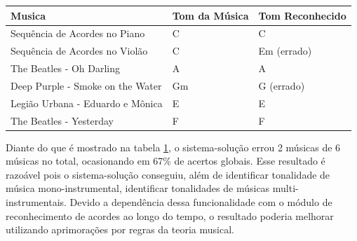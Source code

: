 \begin{table}[h]
\centering
\begin{tabular}{|l|l|l|}
\hline
Musica                           & Tom da Música & Tom Reconhecido \\ \hline
Sequência de Acordes no Piano    & C             & C               \\ \hline
Sequência de Acordes no Violão   & C             & Em (errado)     \\ \hline
The Beatles - Oh Darling         & A             & A               \\ \hline
Deep Purple - Smoke on the Water & Gm            & G (errado)      \\ \hline
Legião Urbana - Eduardo e Mônica & E             & E               \\ \hline
The Beatles - Yesterday          & F             & F               \\ \hline
\end{tabular}
\label{tab:tons}
\end{table}

Diante do que é mostrado na tabela \ref{tab:tons}, o sistema-solução errou 2 músicas de 6 músicas no total, ocasionando em 67\% de acertos globais. Esse resultado é razoável pois o sistema-solução conseguiu, além de identificar tonalidade de música mono-instrumental, identificar tonalidades de músicas multi-instrumentais. Devido a dependência dessa funcionalidade com o módulo de reconhecimento de acordes ao longo do tempo, o resultado poderia melhorar utilizando aprimorações por regras da teoria musical.

